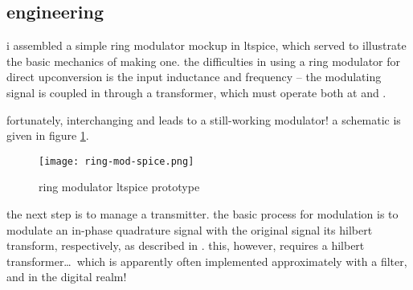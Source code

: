 \subsection*{engineering}
i assembled a simple ring modulator mockup in ltspice, which served to
illustrate the basic mechanics of making one. the difficulties in using a ring
modulator for direct upconversion is the input inductance and frequency -- the
modulating signal is coupled in through a transformer, which must operate both
at \rf and \ifreq.

fortunately, interchanging \rf and \ifreq leads to a still-working modulator! a
schematic is given in figure \ref{fig:ring-mod-spice}.

\begin{figure}[H]
	\centering
	\texttt{[image: ring-mod-spice.png]}
	\caption{ring modulator ltspice prototype}
	\label{fig:ring-mod-spice}
\end{figure}

the next step is to manage a \ssb transmitter. the basic process for \ssb
modulation is to modulate an in-phase \amp quadrature signal with the original
signal \amp its hilbert transform, respectively, as described in
\autocite{matlab-ssb}. this, however, requires a hilbert transformer\ldots\
which is apparently often implemented approximately with a filter, and in the
digital realm!
